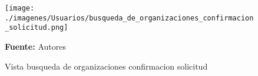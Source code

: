 \begin{figure}[!htb]
  \begin{center}
\texttt{[image: ./imagenes/Usuarios/busqueda\_de\_organizaciones\_confirmacion\_solicitud.png]}
    \caption{Vista busqueda de organizaciones confirmacion solicitud}
    \label{fig:Vista_busqueda_de_organizaciones_confirmacion_solicitud}
    \textbf{Fuente:}  Autores
  \end{center}
\end{figure}

